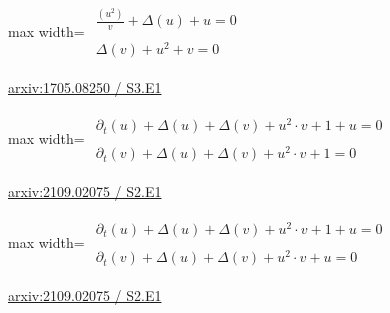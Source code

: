 \documentclass[10pt,a4paper]{article}
\begin{document}
\begin{minipage}{\linewidth}
\begin{center}\begin{adjustbox}{max width=\linewidth}$\displaystyle\begin{gathered}\begin{gathered}\frac{(u^{2})}{v}+\Delta(u)+u=0\end{gathered}\\[5pt]\begin{gathered}\Delta(v)+u^{2}+v=0\end{gathered}\end{gathered}$\end{adjustbox}\end{center}
{\small \href{https://arxiv.org/html/1705.08250#S3.E1}{arxiv:1705.08250 / S3.E1}}\par
\end{minipage}\par\vspace{7mm}

\begin{minipage}{\linewidth}
\begin{center}\begin{adjustbox}{max width=\linewidth}$\displaystyle\begin{gathered}\begin{gathered}\partial_{t}(u)+\Delta(u)+\Delta(v)+u^{2}\cdot v+1+u=0\end{gathered}\\[5pt]\begin{gathered}\partial_{t}(v)+\Delta(u)+\Delta(v)+u^{2}\cdot v+1=0\end{gathered}\end{gathered}$\end{adjustbox}\end{center}
{\small \href{https://arxiv.org/html/2109.02075#S2.E1}{arxiv:2109.02075 / S2.E1}}\par
\end{minipage}\par\vspace{7mm}

\begin{minipage}{\linewidth}
\begin{center}\begin{adjustbox}{max width=\linewidth}$\displaystyle\begin{gathered}\begin{gathered}\partial_{t}(u)+\Delta(u)+\Delta(v)+u^{2}\cdot v+1+u=0\end{gathered}\\[5pt]\begin{gathered}\partial_{t}(v)+\Delta(u)+\Delta(v)+u^{2}\cdot v+u=0\end{gathered}\end{gathered}$\end{adjustbox}\end{center}
{\small \href{https://arxiv.org/html/2109.02075#S2.E1}{arxiv:2109.02075 / S2.E1}}\par
\end{minipage}\par\vspace{7mm}
\end{document}
